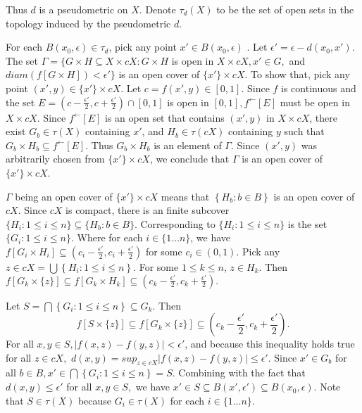 \documentclass{article}
\begin{document}
Thus $d$ is a pseudometric on $X$. Denote $\tau_d(X)$ to be the set of open sets in the topology induced by the pseudometric $d$. 

\vskip 10pt

For each $B(x_0, \epsilon) \in \tau_d$, pick any point $x' \in B(x_0, \epsilon)$ . Let $\epsilon' = \epsilon - d(x_0,x').$ 
The set $\Gamma=\{ G \times H \subseteq X \times cX : G \times H$ is open in $X \times cX, x'\in G,$ and $diam\left(f\left[G\times H\right]\right)<\epsilon' \}$ is an open cover of $\{x'\} \times cX$. To show that, pick any point $(x',y)\in \{x'\} \times cX$. Let $c=f(x',y)\in [0,1].$ Since $f$ is continuous and the set $E=(c-\frac{\epsilon'}{2}, c+\frac{\epsilon'}{2}) \cap [0,1]$ is open in $[0,1], f^\leftarrow[E]$ must be open in $X\times cX$. Since $f^{\leftarrow}[E]$ is an open set that contains $(x',y)$ in $X\times cX$, there exist $G_b \in \tau(X)$ containing $x'$, and $H_b \in \tau(cX)$ containing $y$ such that $G_b\times H_b\subseteq f^\leftarrow[E]$. Thus $G_b\times H_b$ is an element of $\Gamma$. Since $(x',y)$ was arbitrarily chosen from $\{x'\}\times cX$, we conclude that $\Gamma$ is an open cover of $\{x'\}\times cX$.

\vskip 10pt

$\Gamma$ being an open cover of $\{x'\}\times cX$ means that $\left\{ H_b : b \in B \right\}$ is an open cover of $cX$. Since $cX$ is compact, there is an finite subcover $\{ H_i: 1\leq i \leq n\} \subseteq \{H_b : b \in B\}.$ Corresponding to $\{ H_i: 1\leq i \leq n\}$ is the set $\{ G_i: 1\leq i \leq n\}$. Where for each $i \in \{1\dots n\}$, we have $f[G_i \times H_i] \subseteq (c_i-\frac{\epsilon'}{2}, c_i+\frac{\epsilon'}{2})$ for some $c_i \in (0,1).$ Pick any $z \in cX=\bigcup \left\{H_i: 1\leq i\leq n\right\}.$ For some $1 \leq k \leq n$, $z \in H_k$. Then $f[G_k\times \{z\}] \subseteq f[G_k\times H_k]\subseteq (c_k-\frac{\epsilon'}{2}, c_k+\frac{\epsilon'}{2}).$ 

\vskip 10pt

Let $S=\bigcap\left\{G_i:1\leq i \leq n\right\}  \subseteq G_k.$ Then 
$$f[S\times \{z\}]\subseteq f[G_k \times \{z\}] \subseteq (c_k-\frac{\epsilon'}{2}, c_k+\frac{\epsilon'}{2}).$$ 
\vskip 5pt
For all $x,y \in S, |f(x,z)-f(y,z)|<\epsilon'$, and because this inequality holds true for all $z \in cX,$ $d(x,y)=\displaystyle{sup_{z\in cX}} |f(x,z)-f(y,z)|\leq \epsilon'.$ Since $x' \in G_b$ for all $b\in B, x' \in \bigcap \left\{G_i: 1\leq i \leq n\right\} = S.$ Combining with the fact that $d(x,y)\leq \epsilon'$ for all $x,y \in S,$ we have $x' \in S \subseteq B(x',\epsilon') \subseteq B(x_0, \epsilon).$ Note that $S\in \tau(X)$ because $G_i\in \tau(X)$ for each $i\in \{1\dots n\}$.
\end{document}

